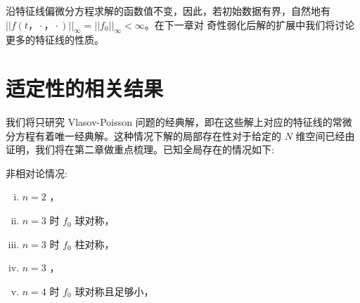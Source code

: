 沿特征线偏微分方程求解的函数值不变，因此，若初始数据有界，自然地有 $||f(t，\cdot，\cdot)||_\infty=||f_0||_\infty<\infty$。在下一章对  奇性弱化后解的扩展中我们将讨论更多的特征线的性质。


\section{适定性的相关结果}


我们将只研究 Vlasov-Poisson 问题的经典解，即在这些解上对应的特征线的常微分方程有着唯一经典解。这种情况下解的局部存在性对于给定的 $N$ 维空间已经由 \cite*{HorstClasssicalI} 证明，我们将在第二章做重点梳理。已知全局存在的情况如下:




非相对论情况:
\begin{enumerate}[(i)]
    \item $n=2$ ， \cite*{Illner1979}
    \item $n=3$ 时 $f_0$ 球对称，\cite*{HorstClasssicalII}
    \item $n=3$ 时 $f_0$ 柱对称， \cite*{hellwig1964partial}
    \item $n=3$ ，\cite*{1991InMat.105..415L}
    \item $n=4$ 时 $f_0$ 球对称且足够小， \cite*{hellwig1964partial}
\end{enumerate}



